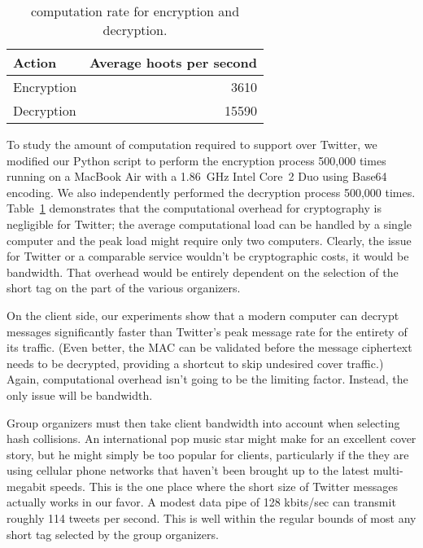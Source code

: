 \begin{table}
\caption{\hoot computation rate for encryption and
  decryption.\label{tab:hps}}
\begin{center}
    \begin{tabular}{ l  r }
	Action & Average hoots per second \\ \hline
	Encryption & 3610 \\
	Decryption & 15590 
    \end{tabular}
\end{center}
\end{table}

To study the amount of computation required to support \hoot over
Twitter, we modified our Python script to perform the encryption process 
500,000 times running on a MacBook
Air with a 1.86~GHz Intel Core~2 Duo using Base64 encoding. We 
also independently performed the decryption process 500,000 times. 
Table~\ref{tab:hps} demonstrates that the computational overhead
for \hoot cryptography is negligible for Twitter; the average
computational load can be handled by a single computer and the peak
load might require only two computers. Clearly, the issue for Twitter
or a comparable service wouldn't be cryptographic costs, it would be
bandwidth. That overhead would be entirely dependent on the selection
of the short tag on the part of the various \hoot organizers. 

On the client side, our experiments show that a modern computer can
decrypt \hoot messages significantly faster than Twitter's peak
message rate for the entirety of its traffic. (Even better, the MAC
can be validated before the message ciphertext needs to be decrypted,
providing a shortcut to skip undesired cover traffic.)  Again,
computational overhead isn't going to be the limiting factor.
Instead, the only issue will be bandwidth.

Group organizers must then take client bandwidth into account when
selecting hash collisions. An international pop music star might make
for an excellent cover story, but he might simply be too popular for
clients, particularly if the they are using cellular phone networks
that haven't been brought up to the latest multi-megabit speeds.
This is the one place where the short size of Twitter
messages actually works in our favor. A modest data pipe of 128
kbits/sec can transmit roughly 114 tweets per second. This is well
within the regular bounds of most any short tag selected by the group
organizers.

